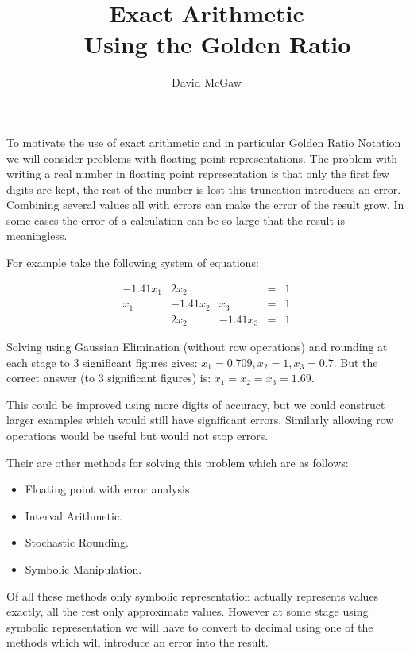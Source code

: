 \newcommand{\Meaning}[1]{\llbracket #1 \rrbracket}


\title{Exact Arithmetic \\~ Using the Golden Ratio}
\author{David McGaw}
\date{}
\maketitle

To motivate the use of exact arithmetic and in particular Golden Ratio Notation we will consider problems with floating point representations.
The problem with writing a real number in floating point representation is that only the first few digits are kept, the rest of the number is lost this truncation introduces an error. Combining several values all with errors can make the error of the result grow. In some cases the error of a calculation can be so large that the result is meaningless.

For example take the following system of equations:

\begin{center}
\[
\begin{array}{ccccc}
-1.41x_{1} & 2x_{2} & & = & 1 \\
x_{1} & -1.41x_{2} & x_{3} & = & 1 \\
 & 2x_{2} & -1.41x_{3}  & = & 1
\end{array}
\]
\end{center}

Solving using Gaussian Elimination (without row operations) and rounding at each stage to 3 significant figures gives: \( x_{1}=0.709, x_{2}=1, x_{3}=0.7.\)
But the correct answer (to 3 significant figures) is: \( x_{1}=x_{2}=x_{3}=1.69. \)

This could be improved using more digits of accuracy, but we could construct larger examples which would still have significant errors. Similarly allowing row operations would be useful but would not stop errors.

Their are other methods for solving this problem which are as follows:
\begin{itemize}
\item Floating point with error analysis.
\item Interval Arithmetic.
\item Stochastic Rounding.
\item Symbolic Manipulation.
\end{itemize}
\vfill

Of all these methods only symbolic representation actually represents values exactly, all the rest only approximate values. However at some stage using symbolic representation we will have to convert to decimal using one of the methods which will introduce an error into the result.

